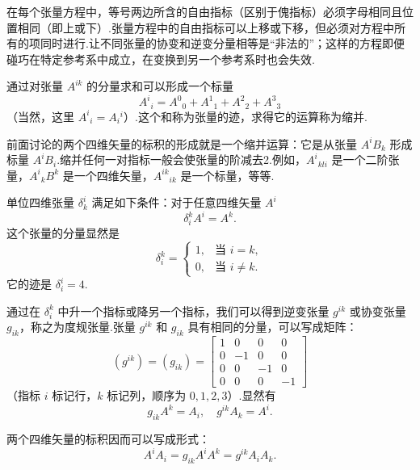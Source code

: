 在每个张量方程中，等号两边所含的自由指标（区别于傀指标）必须字母相同且位置相同（即上或下）.张量方程中的自由指标可以上移或下移，但必须对方程中所有的项同时进行.让不同张量的协变和逆变分量相等是“非法的”；这样的方程即便碰巧在特定参考系中成立，在变换到另一个参考系时也会失效.

通过对张量 $A^{ik}$ 的分量求和可以形成一个标量
\begin{equation*}
  A^i{}_i=A^0{}_0+A^1{}_1+A^2{}_2+A^3{}_3
\end{equation*}
（当然，这里 $A^i{}_i=A_i{}^i$）.这个和称为张量的迹，求得它的运算称为缩并.

前面讨论的两个四维矢量的标积的形成就是一个缩并运算：它是从张量 $A^iB_k$ 形成标量 $A^iB_i$.缩并任何一对指标一般会使张量的阶减去2.例如，$A^i{}_{kli}$ 是一个二阶张量，$A^i{}_kB^k$ 是一个四维矢量，$A^{ik}{}_{ik}$ 是一个标量，等等.

单位四维张量 $\delta^i_k$ 满足如下条件：对于任意四维矢量 $A^i$
\begin{equation}
  \delta^k_iA^i=A^k.
\end{equation}
这个张量的分量显然是
\begin{equation}
  \delta^k_i=
  \begin{cases}
    1, & \text{当 } i=k,\\
    0, & \text{当 } i\neq k.
  \end{cases}
\end{equation}
它的迹是 $\delta^i_i=4$.

通过在 $\delta^k_i$ 中升一个指标或降另一个指标，我们可以得到逆变张量 $g^{ik}$ 或协变张量 $g_{ik}$，称之为度规张量.张量 $g^{ik}$ 和 $g_{ik}$ 具有相同的分量，可以写成矩阵：
\begin{equation}
  (g^{ik})=(g_{ik})=
  \begin{bmatrix}
    1 & 0 & 0 & 0\\
    0 & -1 & 0 & 0\\
    0 & 0 & -1 & 0\\
    0 & 0 & 0 & -1
  \end{bmatrix}
\end{equation}
（指标 $i$ 标记行，$k$ 标记列，顺序为 $0,1,2,3$）.显然有
\begin{equation}
  g_{ik}A^k=A_i,\quad g^{ik}A_k=A^i.
\end{equation}

两个四维矢量的标积因而可以写成形式：
\begin{equation}
  A^iA_i=g_{ik}A^iA^k=g^{ik}A_iA_k.
\end{equation}

